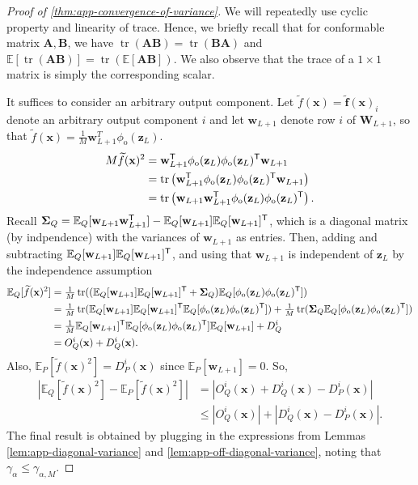 \documentclass[twoside]{article}
\renewcommand{\ss}[1]{_{\text{#1}}}
\newcommand{\vf}{\mathbf{f}}
\newcommand{\vw}{\mathbf{w}}
\newcommand{\vx}{\mathbf{x}}
\newcommand{\vz}{\mathbf{z}}
\newcommand{\mA}{\mathbf{A}}
\newcommand{\mB}{\mathbf{B}}
\newcommand{\mW}{\mathbf{W}}
\newcommand{\mSigma}{\mathbf{\Sigma}}
\newcommand{\E}{\mathbb{E}}
\renewcommand{\P}{\mathbb{P}}
\newcommand{\Q}{\mathbb{Q}}
\renewcommand{\Q}{\ensuremath{Q}}
\renewcommand{\P}{\ensuremath{P}}
\newcommand{\T}{\text{\textsf{T}}}
\newcommand{\opspace}{}
\newcommand{\tr}{\operatorname{tr}\opspace}
\renewcommand{\ss}[1]{_{\text{#1}}}        %
\theoremstyle{theoremstyle}
\begin{document}
\begin{proof}[Proof of \cref{thm:app-convergence-of-variance}]
We will repeatedly use cyclic property and linearity of trace. Hence, we briefly recall that for conformable matrix $\mA, \mB$, we have $\tr(\mA\mB)=\tr(\mB\mA)$ and $\E[\tr(\mA\mB)] = \tr(\E[\mA\mB])$. We also observe that the trace of a $1\times 1$ matrix is simply the corresponding scalar.

It suffices to consider an arbitrary output component. Let $\widetilde{f}(\vx) = \widetilde{\vf}(\vx)_i$ denote an arbitrary output component $i$ and let $\vw_{L+1}$ denote row $i$ of $\mW_{L+1}$, so that $\widetilde{f}(\vx) = \tfrac{1}{M} \vw_{L+1}^T\phi\ss{o}(\vz_L)$. %
\begin{align}
M\widetilde{f}(\vx)^2 &= \vw_{L+1}^\T\phi\ss{o}(\vz_{L})\phi\ss{o}(\vz_{L})^\T \vw_{L+1} \\
& =\tr\left(\vw_{L+1}^\T\phi\ss{o}(\vz_{L})\phi\ss{o}(\vz_{L})^\T \vw_{L+1}\right) \\
& = \tr\left(\vw_{L+1}\vw_{L+1}^\T\phi\ss{o}(\vz_{L})\phi\ss{o}(\vz_{L})^\T \right).
\end{align}
Recall $\mSigma_{Q} =\E_{\Q}[\vw_{L+1}\vw_{L+1}^\T] -  \E_{\Q}[\vw_{L+1}]\E_{\Q}[\vw_{L+1}]^\T$, which is a diagonal matrix (by indpendence) with the variances of $\vw_{L+1}$ as entries. Then, adding and subtracting $\E_{\Q}[\vw_{L+1}]\E_{\Q}[\vw_{L+1}]^\T$, and using that $\vw_{L+1}$ is independent of $\vz_{L}$ by the independence assumption
\begin{align}
    \E_{\Q}[\widetilde{f}(\vx)^2] &=
    \tfrac{1}{M}\tr((\E_{\Q}[\vw_{L+1}]\E_{\Q}[\vw_{L+1}]^\T + \mSigma_{Q}) \E_{\Q}[\phi\ss{o}(\vz_{L})\phi\ss{o}(\vz_{L})^\T] ) \\
    & = \tfrac{1}{M}\tr(\E_{\Q}[\vw_{L+1}]\E_{\Q}[\vw_{L+1}]^\T\E_{\Q}[\phi\ss{o}(\vz_{L})\phi\ss{o}(\vz_{L})^\T] ) + \tfrac{1}{M}\tr(\mSigma_{Q}\E_{\Q}[\phi\ss{o}(\vz_{L})\phi\ss{o}(\vz_{L})^\T]) \\
    & = \tfrac{1}{M}\E_{\Q}[\vw_{L+1}]^\T\E_{\Q}[\phi\ss{o}(\vz_{L})\phi\ss{o}(\vz_{L})^\T]\E_{\Q}[\vw_{L+1}] + D^{i}_{\Q} \\
    &= O^{i}_{\Q}(\vx) + D^{i}_{\Q}(\vx).
\end{align}
Also, $\E_{\P}[\widetilde{f}(\vx)^2] =D^{i}_{\P}(\vx)$ since $\E_{\P}[\vw_{L+1}]=0$. So,
\begin{align}
    |\E_{\Q}[\widetilde{f}(\vx)^2] - \E_{\P}[\widetilde{f}(\vx)^2]| &= |O^{i}_{\Q}(\vx) + D^{i}_{\Q}(\vx) - D^{i}_{\P}(\vx)| \\
    & \leq |O^{i}_{\Q}(\vx)|  + |D^{i}_{\Q}(\vx) - D^{i}_{\P}(\vx)|.
\end{align}
The final result is obtained by plugging in the expressions from Lemmas \ref{lem:app-diagonal-variance} and \ref{lem:app-off-diagonal-variance}, noting that $\gamma_{\alpha} \le \gamma_{\alpha, M}$.
\end{proof}
\end{document}
